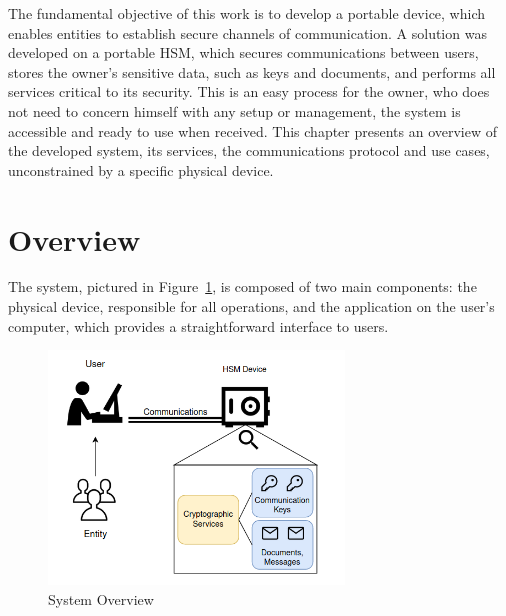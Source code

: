 \cleardoublepage
\label{chap:arch}

The fundamental objective of this work is to develop a portable device,  which enables entities to establish secure channels of communication.
A solution was developed on a portable HSM, which secures communications between users, stores the owner's sensitive data, such as keys and documents, and performs all services critical to its security. This is an easy process for the owner, who does not need to concern himself with any setup or management, the system is accessible and ready to use when received.
This chapter presents an overview of the developed system, its services, the communications protocol and use cases, unconstrained by a specific physical device.

\section{Overview}\label{chap:arch:overview}

The system, pictured in Figure~\ref{fig:overview}, is composed of two main components: the physical device, responsible for all operations, and the application on the user's computer, which provides a straightforward interface to users.

\begin{figure}[h]
    \centering
    \includegraphics[width=0.7\textwidth]{./Images/overview.png}
    \caption{System Overview}
    \label{fig:overview}
\end{figure}

